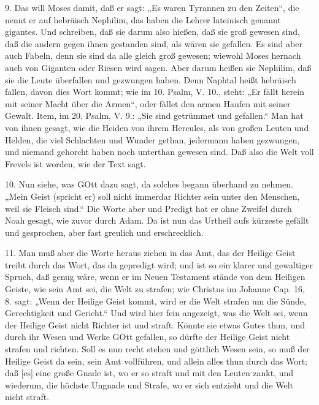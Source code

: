 9. Das will Moses damit, daß er sagt: „Es waren Tyrannen zu den Zeiten“, die nennt er auf hebräisch Nephilim, das haben die Lehrer lateinisch genannt gigantes. Und schreiben, daß sie darum also hießen, daß sie groß gewesen sind, daß die andern gegen ihnen gestanden sind, als wären sie gefallen. Es sind aber auch Fabeln, denn sie sind da alle gleich groß gewesen; wiewohl Moses hernach auch von Giganten oder Riesen wird sagen. Aber darum heißen sie Nephilim, daß sie die Leute überfallen und gezwungen haben. Denn Naphtal heißt hebräisch fallen, davon dies Wort kommt; wie im 10. Psalm, V. 10., steht: „Er fällt herein mit seiner Macht über die Armen“, oder fället den armen Haufen mit seiner Gewalt. Item, im 20. Psalm, V. 9.: „Sie sind getrümmet und gefallen.“ Man hat von ihnen gesagt, wie die Heiden von ihrem Hercules, als von großen Leuten und Helden, die viel Schlachten und Wunder gethan, jedermann haben gezwungen, und niemand gehorcht haben noch unterthan gewesen sind. Daß also die Welt voll Frevels ist worden, wie der Text sagt.

10. Nun siehe, was GOtt dazu sagt, da solches begann überhand zu nehmen. „Mein Geist (spricht er) soll nicht immerdar Richter sein unter
den Menschen, weil sie Fleisch sind.“ Die Worte aber und Predigt hat er ohne Zweifel durch Noah gesagt, wie zuvor durch Adam. Da ist nun das Urtheil aufs kürzeste gefällt und gesprochen, aber fast greulich und erschrecklich.

11. Man muß aber die Worte heraus ziehen in das Amt, das der Heilige Geist treibt durch das Wort, das da gepredigt wird; und ist so ein klarer und gewaltiger Spruch, daß genug wäre, wenn er im Neuen Testament stände von dem Heiligen Geiste, wie sein Amt sei, die Welt zu strafen; wie Christus im Johanne Cap. 16, 8. sagt: „Wenn der Heilige Geist kommt, wird er die Welt strafen um die Sünde, Gerechtigkeit und Gericht.“ Und wird hier fein angezeigt, was die Welt sei, wenn der Heilige Geist nicht Richter ist und straft. Könnte sie etwas Gutes thun, und durch ihr Wesen und Werke GOtt gefallen, so dürfte der Heilige Geist nicht strafen und richten. Soll es nun recht stehen und göttlich Wesen sein, so muß der Heilige Geist da sein, sein Amt vollführen, und allein alles thun durch das Wort; daß [es] eine große Gnade ist, wo er so straft und mit den Leuten zankt, und wiederum, die höchste Ungnade und Strafe, wo er sich entzieht und die Welt nicht straft.

